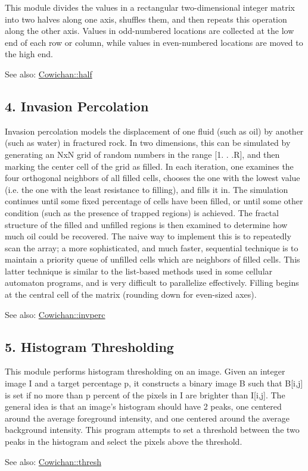 This module divides the values in a rectangular two-dimensional integer matrix into two halves along one axis, shuffles them, and then repeats this operation along the other axis. Values in odd-numbered locations are collected at the low end of each row or column, while values in even-numbered locations are moved to the high end. \begin{Desc}
\item[See also:]\hyperlink{class_cowichan_308603053675bccbe631f04af921f57c}{Cowichan::half}\end{Desc}
\hypertarget{index_invperc_sec}{}\subsection{4. Invasion Percolation}\label{index_invperc_sec}
Invasion percolation models the displacement of one fluid (such as oil) by another (such as water) in fractured rock. In two dimensions, this can be simulated by generating an NxN grid of random numbers in the range \mbox{[}1. . .R\mbox{]}, and then marking the center cell of the grid as filled. In each iteration, one examines the four orthogonal neighbors of all filled cells, chooses the one with the lowest value (i.e. the one with the least resistance to filling), and fills it in. The simulation continues until some fixed percentage of cells have been filled, or until some other condition (such as the presence of trapped regions) is achieved. The fractal structure of the filled and unfilled regions is then examined to determine how much oil could be recovered. The naive way to implement this is to repeatedly scan the array; a more sophisticated, and much faster, sequential technique is to maintain a priority queue of unfilled cells which are neighbors of filled cells. This latter technique is similar to the list-based methods used in some cellular automaton programs, and is very difficult to parallelize effectively. Filling begins at the central cell of the matrix (rounding down for even-sized axes). \begin{Desc}
\item[See also:]\hyperlink{class_cowichan_ea126792a31e54a8722663b7ea768955}{Cowichan::invperc}\end{Desc}
\hypertarget{index_thresh_sec}{}\subsection{5. Histogram Thresholding}\label{index_thresh_sec}
This module performs histogram thresholding on an image. Given an integer image I and a target percentage p, it constructs a binary image B such that B\mbox{[}i,j\mbox{]} is set if no more than p percent of the pixels in I are brighter than I\mbox{[}i,j\mbox{]}. The general idea is that an image's histogram should have 2 peaks, one centered around the average foreground intensity, and one centered around the average background intensity. This program attempts to set a threshold between the two peaks in the histogram and select the pixels above the threshold. \begin{Desc}
\item[See also:]\hyperlink{class_cowichan_a0b633b8c1f21884e0998a9c7020c08c}{Cowichan::thresh}\end{Desc}
